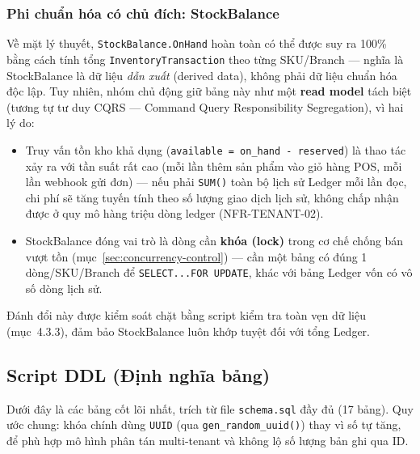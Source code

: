 \subsubsection{Phi chuẩn hóa có chủ đích: StockBalance}
Về mặt lý thuyết, \texttt{StockBalance.OnHand} hoàn toàn có thể được suy ra 100\% bằng cách tính tổng \texttt{InventoryTransaction} theo từng SKU/Branch — nghĩa là StockBalance là dữ liệu \emph{dẫn xuất} (derived data), không phải dữ liệu chuẩn hóa độc lập. Tuy nhiên, nhóm chủ động giữ bảng này như một \textbf{read model} tách biệt (tương tự tư duy CQRS — Command Query Responsibility Segregation), vì hai lý do:
\begin{itemize}
    \item Truy vấn tồn kho khả dụng (\texttt{available = on\_hand - reserved}) là thao tác xảy ra với tần suất rất cao (mỗi lần thêm sản phẩm vào giỏ hàng POS, mỗi lần webhook gửi đơn) — nếu phải \texttt{SUM()} toàn bộ lịch sử Ledger mỗi lần đọc, chi phí sẽ tăng tuyến tính theo số lượng giao dịch lịch sử, không chấp nhận được ở quy mô hàng triệu dòng ledger (NFR-TENANT-02).
    \item StockBalance đóng vai trò là dòng cần \textbf{khóa (lock)} trong cơ chế chống bán vượt tồn (mục~\ref{sec:concurrency-control}) — cần một bảng có đúng 1 dòng/SKU/Branch để \texttt{SELECT...FOR UPDATE}, khác với bảng Ledger vốn có vô số dòng lịch sử.
\end{itemize}
Đánh đổi này được kiểm soát chặt bằng script kiểm tra toàn vẹn dữ liệu (mục~4.3.3), đảm bảo StockBalance luôn khớp tuyệt đối với tổng Ledger.

\subsection{Script DDL (Định nghĩa bảng)}

Dưới đây là các bảng cốt lõi nhất, trích từ file \texttt{schema.sql} đầy đủ (17 bảng). Quy ước chung: khóa chính dùng \texttt{UUID} (qua \texttt{gen\_random\_uuid()}) thay vì số tự tăng, để phù hợp mô hình phân tán multi-tenant và không lộ số lượng bản ghi qua ID.

